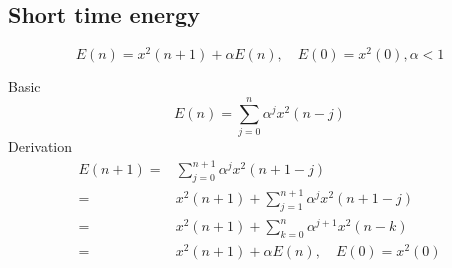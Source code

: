\subsection{Short time energy} %
\label{sub:short_time_energy}
\begin{definition}
	\begin{equation}
		E(n) = x^2(n+1)+\alpha E(n), \quad E(0)=x^2(0),\alpha<1
	\end{equation}
\end{definition}
Basic \cite{rabiner78}
\begin{equation}
	E(n)=\sum_{j=0}^{n}\alpha^jx^2(n-j)
\end{equation}
Derivation
\begin{equation}
	\begin{split}
		E(n+1)=& \sum_{j=0}^{n+1}\alpha^jx^2(n+1-j)\\
		=& x^2(n+1)+\sum_{j=1}^{n+1}\alpha^jx^2(n+1-j)\\
		=& x^2(n+1)+\sum_{k=0}^{n}\alpha^{j+1} x^2(n-k)\\
		=& x^2(n+1)+\alpha E(n), \quad E(0)=x^2(0)\\
	\end{split}
\end{equation}


% 
% 
% 
% 

